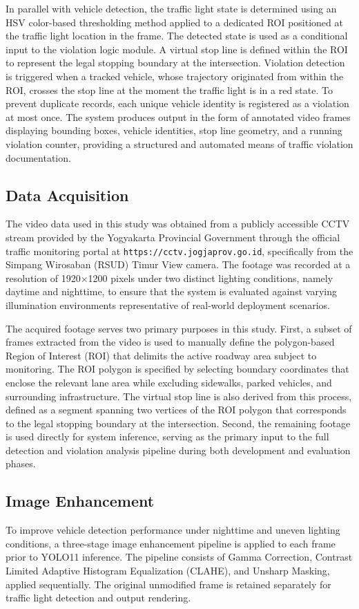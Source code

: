 In parallel with vehicle detection, the traffic light state is determined using an HSV color-based thresholding method applied to a dedicated ROI positioned at the traffic light location in the frame. The detected state is used as a conditional input to the violation logic module. A virtual stop line is defined within the ROI to represent the legal stopping boundary at the intersection. Violation detection is triggered when a tracked vehicle, whose trajectory originated from within the ROI, crosses the stop line at the moment the traffic light is in a red state. To prevent duplicate records, each unique vehicle identity is registered as a violation at most once. The system produces output in the form of annotated video frames displaying bounding boxes, vehicle identities, stop line geometry, and a running violation counter, providing a structured and automated means of traffic violation documentation.

\subsection{Data Acquisition}
The video data used in this study was obtained from a publicly accessible CCTV stream provided by the Yogyakarta Provincial Government through the official traffic monitoring portal at \texttt{https://cctv.jogjaprov.go.id}, specifically from the Simpang Wirosaban (RSUD) Timur View camera. The footage was recorded at a resolution of 1920$\times$1200 pixels under two distinct lighting conditions, namely daytime and nighttime, to ensure that the system is evaluated against varying illumination environments representative of real-world deployment scenarios.

The acquired footage serves two primary purposes in this study. First, a subset of frames extracted from the video is used to manually define the polygon-based Region of Interest (ROI) that delimits the active roadway area subject to monitoring. The ROI polygon is specified by selecting boundary coordinates that enclose the relevant lane area while excluding sidewalks, parked vehicles, and surrounding infrastructure. The virtual stop line is also derived from this process, defined as a segment spanning two vertices of the ROI polygon that corresponds to the legal stopping boundary at the intersection. Second, the remaining footage is used directly for system inference, serving as the primary input to the full detection and violation analysis pipeline during both development and evaluation phases.

\subsection{Image Enhancement}
To improve vehicle detection performance under nighttime and uneven lighting conditions, a three-stage image enhancement pipeline is applied to each frame prior to YOLO11 inference. The pipeline consists of Gamma Correction, Contrast Limited Adaptive Histogram Equalization (CLAHE), and Unsharp Masking, applied sequentially. The original unmodified frame is retained separately for traffic light detection and output rendering.

